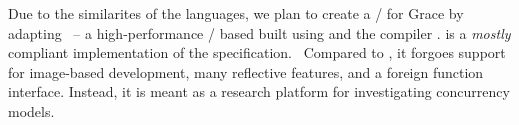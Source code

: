 Due to the similarites of the languages, we plan to create a \VM/ for Grace by adapting \SOMns {} ~-- a high-performance \VM/ based built using \Truffle and the \Graal \JITing compiler . \SOMns is a \emph{mostly} compliant implementation of the \Newspeak specification.\footnotemark~ Compared to \Newspeak, it forgoes support for image-based development, many reflective features, and a foreign function interface. Instead, it is meant as a research platform for investigating concurrency models.




% 











% 
